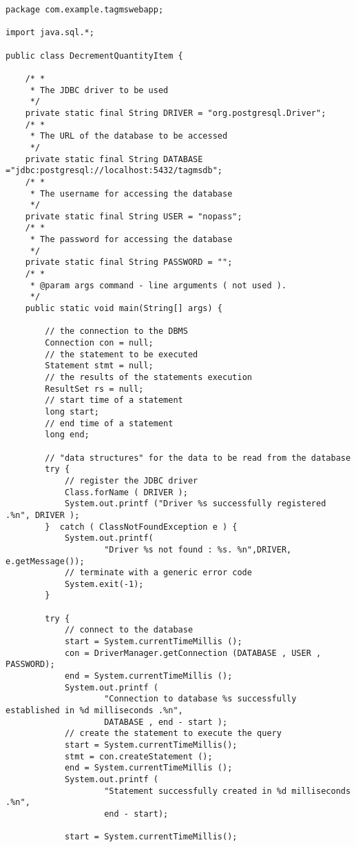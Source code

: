 \begin{lstlisting}
package com.example.tagmswebapp;

import java.sql.*;

public class DecrementQuantityItem {

    /* *
     * The JDBC driver to be used
     */
    private static final String DRIVER = "org.postgresql.Driver";
    /* *
     * The URL of the database to be accessed
     */
    private static final String DATABASE ="jdbc:postgresql://localhost:5432/tagmsdb";
    /* *
     * The username for accessing the database
     */
    private static final String USER = "nopass";
    /* *
     * The password for accessing the database
     */
    private static final String PASSWORD = "";
    /* *
     * @param args command - line arguments ( not used ).
     */
    public static void main(String[] args) {

        // the connection to the DBMS
        Connection con = null;
        // the statement to be executed
        Statement stmt = null;
        // the results of the statements execution
        ResultSet rs = null;
        // start time of a statement
        long start;
        // end time of a statement
        long end;

        // "data structures" for the data to be read from the database
        try {
            // register the JDBC driver
            Class.forName ( DRIVER );
            System.out.printf ("Driver %s successfully registered .%n", DRIVER );
        }  catch ( ClassNotFoundException e ) {
            System.out.printf(
                    "Driver %s not found : %s. %n",DRIVER, e.getMessage());
            // terminate with a generic error code
            System.exit(-1);
        }

        try {
            // connect to the database
            start = System.currentTimeMillis ();
            con = DriverManager.getConnection (DATABASE , USER , PASSWORD);
            end = System.currentTimeMillis ();
            System.out.printf (
                    "Connection to database %s successfully established in %d milliseconds .%n",
                    DATABASE , end - start );
            // create the statement to execute the query
            start = System.currentTimeMillis();
            stmt = con.createStatement ();
            end = System.currentTimeMillis ();
            System.out.printf (
                    "Statement successfully created in %d milliseconds .%n",
                    end - start);

            start = System.currentTimeMillis();



\end{lstlisting}
